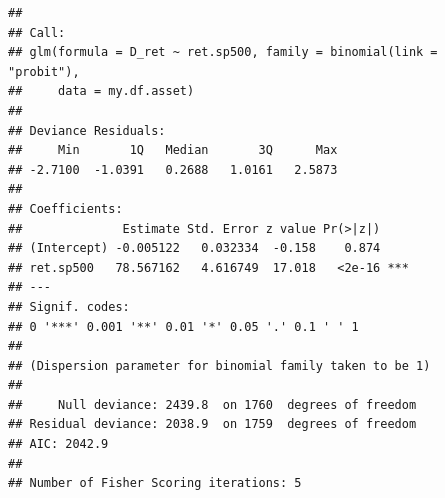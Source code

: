 \documentclass[11pt,]{book}
\newenvironment{Shaded}{\begin{snugshade}}{\end{snugshade}}
\newcommand{\KeywordTok}[1]{\textcolor[rgb]{0.27,0.27,0.27}{\textbf{#1}}}
\newcommand{\DataTypeTok}[1]{\textcolor[rgb]{0.27,0.27,0.27}{#1}}
\newcommand{\DecValTok}[1]{\textcolor[rgb]{0.06,0.06,0.06}{#1}}
\newcommand{\StringTok}[1]{\textcolor[rgb]{0.5,0.5,0.5}{#1}}
\newcommand{\CommentTok}[1]{\textcolor[rgb]{0.56,0.35,0.01}{\textit{#1}}}
\newcommand{\OperatorTok}[1]{\textcolor[rgb]{0.81,0.36,0.00}{\textbf{#1}}}
\newcommand{\NormalTok}[1]{#1}
\begin{document}
\begin{Shaded}
\end{Shaded}

\begin{verbatim}
## 
## Call:
## glm(formula = D_ret ~ ret.sp500, family = binomial(link = "probit"), 
##     data = my.df.asset)
## 
## Deviance Residuals: 
##     Min       1Q   Median       3Q      Max  
## -2.7100  -1.0391   0.2688   1.0161   2.5873  
## 
## Coefficients:
##              Estimate Std. Error z value Pr(>|z|)    
## (Intercept) -0.005122   0.032334  -0.158    0.874    
## ret.sp500   78.567162   4.616749  17.018   <2e-16 ***
## ---
## Signif. codes:  
## 0 '***' 0.001 '**' 0.01 '*' 0.05 '.' 0.1 ' ' 1
## 
## (Dispersion parameter for binomial family taken to be 1)
## 
##     Null deviance: 2439.8  on 1760  degrees of freedom
## Residual deviance: 2038.9  on 1759  degrees of freedom
## AIC: 2042.9
## 
## Number of Fisher Scoring iterations: 5
\end{verbatim}
\end{document}
